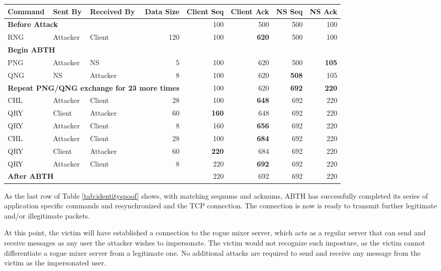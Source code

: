 \documentclass{sig-alternate}
\begin{document}
\begin{table*}[tbp]
	\centering

	\caption{Identity Spoofing Sequence Numbers}
	\label{tab:identityspoof}

	\begin{tabular}{l l l r r r r r}
		\hline
		\hline
		\textbf{Command} & \textbf{Sent By} & \textbf{Received By} & \textbf{Data Size} & \textbf{Client Seq} & \textbf{Client Ack} & \textbf{NS Seq} & \textbf{NS Ack} \\
		\hline
		\multicolumn{4}{l}{\textbf{Before Attack}} & 100 & 500 & 500 & 100 \\
		RNG & Attacker & Client & 120 & 100 & \textbf{620} & 500 & 100 \\
		\multicolumn{8}{l}{\textbf{Begin ABTH}} \\
		PNG & Attacker & NS & 5 & 100 & 620 & 500 & \textbf{105} \\
		QNG & NS & Attacker & 8 & 100 & 620 & \textbf{508} & 105 \\
		\multicolumn{4}{l}{\textbf{Repeat PNG/QNG exchange for 23 more times}} & 100 & 620 & \textbf{692} & \textbf{220} \\
		CHL & Attacker & Client & 28 & 100 & \textbf{648} & 692 & 220 \\
		QRY & Client & Attacker & 60 & \textbf{160} & 648 & 692 & 220 \\
		QRY & Attacker & Client & 8 & 160 & \textbf{656} & 692 & 220 \\
		CHL & Attacker & Client & 28 & 100 & \textbf{684} & 692 & 220 \\
		QRY & Client & Attacker & 60 & \textbf{220} & 684 & 692 & 220 \\
		QRY & Attacker & Client & 8 & 220 & \textbf{692} & 692 & 220 \\
		\hline
		\hline
		\multicolumn{4}{l}{\textbf{After ABTH}} & 220 & 692 & 692 & 220 \\
	\end{tabular}
\end{table*}

As the last row of Table \ref{tab:identityspoof} shows, with matching seqnums and acknums, ABTH has successfully completed its series of application specific commands and resynchronized and the TCP connection.
The connection is now is ready to transmit further legitimate and/or illegitimate packets.

At this point, the victim will have established a connection to the rogue mixer server, which acts as a regular server that can send and receive messages as any user the attacker wishes to impersonate.
The victim would not recognize such imposture, as the victim cannot differentiate a rogue mixer server from a legitimate one.
No additional attacks are required to send and receive any message from the victim as the impersonated user.
\end{document}
